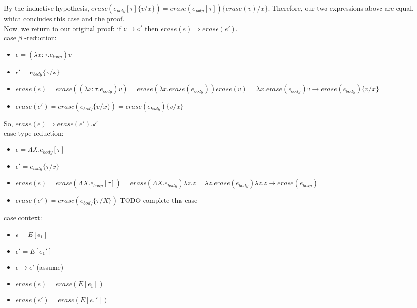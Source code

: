 \documentclass[10pt]{article}
\begin{document}
\begin{exercise}
By the inductive hypothesis, $\mathit{erase}(e_{poly}[\tau]\{v/x\}) = \mathit{erase}(e_{poly}[\tau])\{\mathit{erase}(v)/x\}$. Therefore, our two expressions above are equal, which concludes this case and the proof. \checkmark\\


Now, we return to our original proof: if $e \rightarrow e'$ then
$\mathit{erase}(e) \Rightarrow \mathit{erase}(e')$.\\

{\sc case} $\beta$ {\sc -reduction}:\\
\begin{itemize}

\item $e = (\lambda x: \tau. e_{body}) v$

\item $e' = e_{body}\{v/x\}$

\item $\mathit{erase}(e) = \mathit{erase}((\lambda x:\tau. e_{body}) v) = \mathit{erase}(\lambda x.\mathit{erase}(e_{body})) \mathit{erase}(v) = \lambda x.\mathit{erase}(e_{body}) v \rightarrow \mathit{erase}(e_{body})\{v/x\}$

\item $\mathit{erase}(e') = \mathit{erase}(e_{body} \{v/x\}) = \mathit{erase}(e_{body})\{v/x\}$\\

\end{itemize}

So, $\mathit{erase}(e) \Rightarrow \mathit{erase}(e'). \checkmark$ \\

{\sc case type-reduction}:

\begin{itemize}
\item $e = \Lambda X. e_{body} [\tau]$
\item $e' = e_{body} \{\tau / x\}$
\item $\mathit{erase}(e) = \mathit{erase}(\Lambda X. e_{body}[\tau]) = \mathit{erase}(\Lambda X. e_{body}) \lambda z.z = \lambda z.\mathit{erase}(e_{body}) \lambda z. z \rightarrow \mathit{erase}(e_{body})$
\item $\mathit{erase}(e') = \mathit{erase}(e_{body} \{\tau/X\})$ TODO complete this case
\end{itemize}


{\sc case context}: 
\begin{itemize}
\item $e = E[e_1]$
\item $e' = E[e_1']$
\item $e \rightarrow e'$ (assume)
\item $\mathit{erase}(e) = \mathit{erase}(E[e_1])$
\item $\mathit{erase}(e') = \mathit{erase}(E[e_1'])$
\end{itemize}


\end{exercise}
\end{document}
